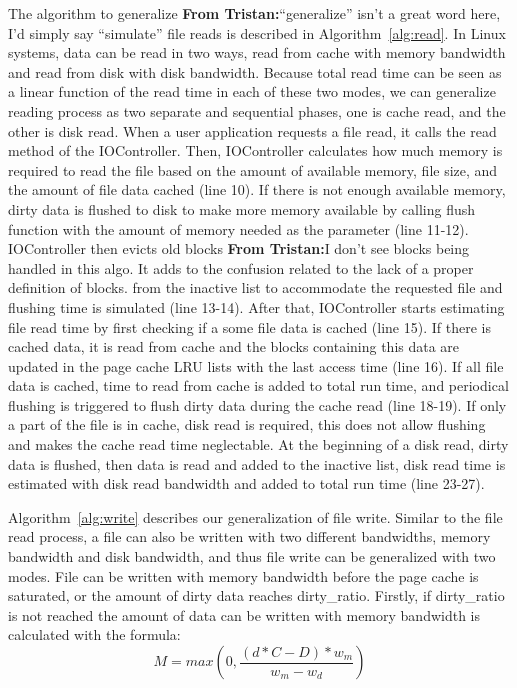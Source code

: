 \documentclass[conference]{IEEEtran}
\newcommand{\tristan}[1]{\color{orange}\textbf{From Tristan:}#1\color{black}}
\begin{document}
			The algorithm to generalize \tristan{``generalize'' isn't a great word here, I'd simply say ``simulate''} file reads is described in 
			Algorithm~\ref{alg:read}. In Linux systems, data can be read in 
			two ways, read from cache with memory bandwidth and read from disk 
			with disk bandwidth. Because total read time can be seen as a 
			linear function of the read time in each of these two modes, 
			we can generalize reading process as two separate and sequential phases, 
			one is cache read, and the other is disk read. When a user application 
			requests a file read, it calls the read method of the IOController. Then, 
			IOController calculates how much memory is required to read the file 
			based on the amount of available memory, file size, and the amount of 
			file data cached (line 10). If there is not enough available memory, 
			dirty data is flushed to disk to make more memory available by calling flush
			function with the amount of memory needed as the parameter (line 11-12).
			IOController then evicts old blocks \tristan{I don't see blocks being handled in this algo. It adds to the confusion related to the 
			lack of a proper definition of blocks.} from the inactive list to
			accommodate the requested file and flushing time is simulated (line 13-14). 
			After that, IOController starts estimating file read time by first checking 
			if a some file data is cached (line 15). If there is cached data, 
			it is read from cache and the blocks containing this data are updated in 
			the page cache LRU lists with the last access time (line 16). If all file data 
			is cached, time to read from cache is added to total run time, and 
			periodical flushing is triggered to flush dirty data during the cache read 
			(line 18-19). If only a part of the file is in cache, disk read is required, 
			this does not allow flushing and makes the cache read time neglectable. 
			At the beginning of a disk read, dirty data is flushed, then data is read 
			and added to the inactive list, disk read time is estimated with disk read 
			bandwidth and added to total run time (line 23-27). 

			Algorithm~\ref{alg:write} describes our
			generalization of file write. Similar to the file read process,
			a file can also be written with two different bandwidths,
			memory bandwidth and disk bandwidth, and thus file write can be
			generalized with two modes. File can be written with memory
			bandwidth before the page cache is saturated, or the amount of
			dirty data reaches dirty\_ratio. Firstly, if dirty\_ratio is not reached 
			the amount of data can be written with memory bandwidth is
			calculated with the formula:
			\begin{equation}
				M = max(0, \frac{(d*C - D)*w_m}{w_m - w_d})\label{equa:freeamt}
			\end{equation}			 			
\end{document}
